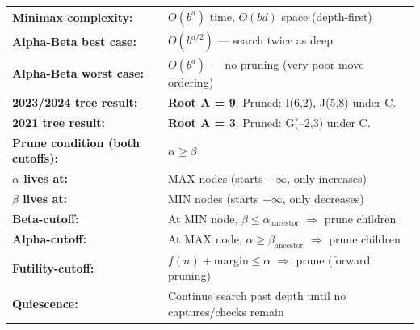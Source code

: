 \documentclass[12pt, a4paper]{article}
\newenvironment{notesbox}{\begin{mdframed}[style=notesframe]}{\end{mdframed}}
\begin{document}
\begin{notesbox}
\begin{tabular}{ll}
\textbf{Minimax complexity:} & $O(b^d)$ time, $O(bd)$ space (depth-first)\\
\textbf{Alpha-Beta best case:} & $O(b^{d/2})$ --- search twice as deep\\
\textbf{Alpha-Beta worst case:} & $O(b^d)$ --- no pruning (very poor move ordering)\\
\textbf{2023/2024 tree result:} & \textbf{Root A = 9}. Pruned: I(6,2), J(5,8) under C.\\
\textbf{2021 tree result:} & \textbf{Root A = 3}. Pruned: G(--2,3) under C.\\
\textbf{Prune condition (both cutoffs):} & $\alpha \geq \beta$\\
\textbf{$\alpha$ lives at:} & MAX nodes (starts $-\infty$, only increases)\\
\textbf{$\beta$ lives at:} & MIN nodes (starts $+\infty$, only decreases)\\
\textbf{Beta-cutoff:} & At MIN node, $\beta \leq \alpha_{\text{ancestor}}$ $\Rightarrow$ prune children\\
\textbf{Alpha-cutoff:} & At MAX node, $\alpha \geq \beta_{\text{ancestor}}$ $\Rightarrow$ prune children\\
\textbf{Futility-cutoff:} & $f(n) + \text{margin} \leq \alpha$ $\Rightarrow$ prune (forward pruning)\\
\textbf{Quiescence:} & Continue search past depth until no captures/checks remain\\
\end{tabular}
\end{notesbox}
\end{document}
